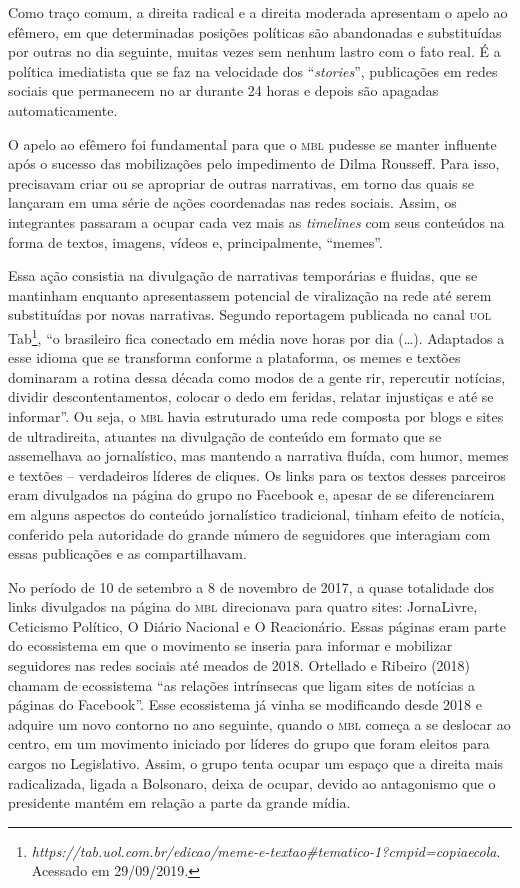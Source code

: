 Como traço comum, a direita radical e a direita moderada apresentam o
apelo ao efêmero, em que determinadas posições políticas são abandonadas
e substituídas por outras no dia seguinte, muitas vezes sem nenhum
lastro com o fato real. É a política imediatista que se faz na
velocidade dos ``\emph{stories}'', publicações em redes sociais que
permanecem no ar durante 24 horas e depois são apagadas automaticamente.

O apelo ao efêmero foi fundamental para que o \textsc{mbl} pudesse se manter
influente após o sucesso das mobilizações pelo impedimento de Dilma
Rousseff. Para isso, precisavam criar ou se apropriar de outras
narrativas, em torno das quais se lançaram em uma série de ações
coordenadas nas redes sociais. Assim, os integrantes passaram a ocupar
cada vez mais as \emph{timelines} com seus conteúdos na forma de textos,
imagens, vídeos e, principalmente, ``memes''.

Essa ação consistia na divulgação de narrativas temporárias e fluidas,
que se mantinham enquanto apresentassem potencial de viralização na rede
até serem substituídas por novas narrativas. Segundo reportagem
publicada no canal \textsc{uol} Tab\footnote{\emph{https://tab.uol.com.br/edicao/meme-e-textao\#tematico-1?cmpid=copiaecola}.
  Acessado em 29/09/2019.}, ``o brasileiro fica conectado em média nove
horas por dia (\ldots{}). Adaptados a esse idioma que se transforma conforme
a plataforma, os memes e textões dominaram a rotina dessa década como
modos de a gente rir, repercutir notícias, dividir descontentamentos,
colocar o dedo em feridas, relatar injustiças e até se informar''. Ou
seja, o \textsc{mbl} havia estruturado uma rede composta por blogs e sites de
ultradireita, atuantes na divulgação de conteúdo em formato que se
assemelhava ao jornalístico, mas mantendo a narrativa fluída, com humor,
memes e textões -- verdadeiros líderes de cliques. Os links para os
textos desses parceiros eram divulgados na página do grupo no Facebook
e, apesar de se diferenciarem em alguns aspectos do conteúdo
jornalístico tradicional, tinham efeito de notícia, conferido pela
autoridade do grande número de seguidores que interagiam com essas
publicações e as compartilhavam.

No período de 10 de setembro a 8 de novembro de 2017, a quase totalidade
dos links divulgados na página do \textsc{mbl} direcionava para quatro sites:
JornaLivre, Ceticismo Político, O Diário Nacional e O Reacionário. Essas
páginas eram parte do ecossistema em que o movimento se inseria para
informar e mobilizar seguidores nas redes sociais até meados de 2018.
Ortellado e Ribeiro (2018) chamam de ecossistema ``as relações
intrínsecas que ligam sites de notícias a páginas do Facebook''. Esse
ecossistema já vinha se modificando desde 2018 e adquire um novo
contorno no ano seguinte, quando o \textsc{mbl} começa a se deslocar ao centro,
em um movimento iniciado por líderes do grupo que foram eleitos para
cargos no Legislativo. Assim, o grupo tenta ocupar um espaço que a
direita mais radicalizada, ligada a Bolsonaro, deixa de ocupar, devido
ao antagonismo que o presidente mantém em relação a parte da grande
mídia.

